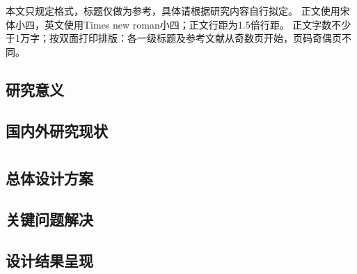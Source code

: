 \setcounter{section}{0}

\cleardoublepage
\section{} %
\label{sec:引言}
	
	本文只规定格式，标题仅做为参考，具体请根据研究内容自行拟定。
	正文使用宋体小四，英文使用Times new roman小四；正文行距为1.5倍行距。
	正文字数不少于1万字；按双面打印排版：各一级标题及参考文献从奇数页开始，页码奇偶页不同。

	\subsection{研究意义} %
	\label{sub:研究意义}

	\newpage

	\subsection{国内外研究现状} %
	\label{sub:国内外研究现状}


\cleardoublepage
\section{} %
\label{sec:系统设计方案}
	\subsection{总体设计方案} %
	\label{sub:总体设计方案}
	
	\newpage

	\subsection{关键问题解决} %
	\label{sub:关键问题解决}
	
	\newpage

	\subsection{设计结果呈现} %
	\label{sub:设计结果呈现}
	
